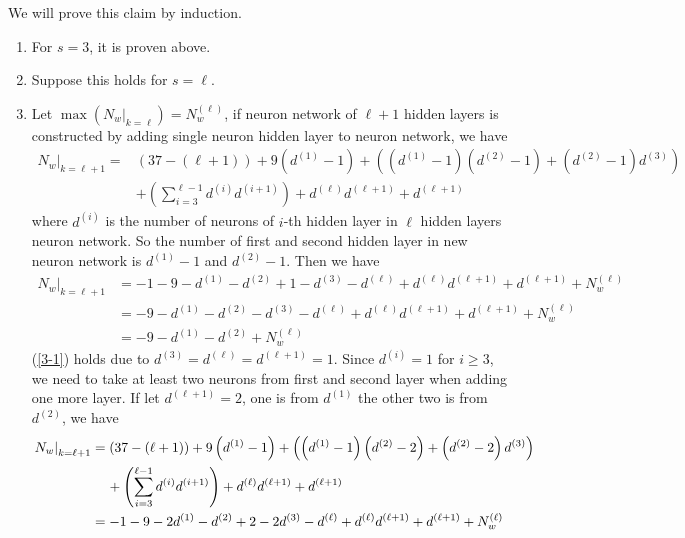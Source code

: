 \documentclass[12pt]{article}
\newcommand{\ParTh}[1]{\left(#1\right)}
\begin{document}
We will prove this claim by induction.
\begin{enumerate}
	\item For $s=3$, it is proven above.
	\item Suppose this holds for $s=\ell$.
	\item Let $\max\ParTh{\left.N_w\right|_{k=\ell}}=N^{\ParTh{\ell}}_w$, if neuron network of $\ell+1$ hidden layers is constructed by adding single neuron hidden layer to neuron network, we have
	\begin{align}
	\nonumber
	\left.N_w\right|_{k=\ell+1}=&\ParTh{37-\ParTh{\ell+1}}+9\ParTh{d^{\ParTh{1}}-1}+\ParTh{\ParTh{d^{\ParTh{1}}-1}\ParTh{d^{\ParTh{2}}-1}+\ParTh{d^{\ParTh{2}}-1}d^{\ParTh{3}}}\\
	&+\ParTh{\sum_{i=3}^{\ell-1}d^{\ParTh{i}}d^{\ParTh{i+1}}}+d^{\ParTh{\ell}}d^{\ParTh{\ell+1}}+d^{\ParTh{\ell+1}}
	\end{align}
	where $d^{\ParTh{i}}$ is the number of neurons of $i$-th hidden layer in $\ell$ hidden layers neuron network. So the number of first and second hidden layer in new neuron network is $d^{\ParTh{1}}-1$ and $d^{\ParTh{2}}-1$. Then we have
	\begin{align}
	\left.N_w\right|_{k=\ell+1}&=-1-9-d^{\ParTh{1}}-d^{\ParTh{2}}+1-d^{\ParTh{3}}-d^{\ParTh{\ell}}+d^{\ParTh{\ell}}d^{\ParTh{\ell+1}}+d^{\ParTh{\ell+1}}+N^{\ParTh{\ell}}_w\\
	&=-9-d^{\ParTh{1}}-d^{\ParTh{2}}-d^{\ParTh{3}}-d^{\ParTh{\ell}}+d^{\ParTh{\ell}}d^{\ParTh{\ell+1}}+d^{\ParTh{\ell+1}}+N^{\ParTh{\ell}}_w\\
	\label{3-1}
	&=-9-d^{\ParTh{1}}-d^{\ParTh{2}}+N^{\ParTh{\ell}}_w
	\end{align}
	(\ref{3-1}) holds due to $d^{\ParTh{3}}=d^{\ParTh{\ell}}=d^{\ParTh{\ell+1}}=1$. Since $d^{\ParTh{i}}=1$ for $i\geq3$, we need to take at least two neurons from first and second layer when adding one more layer. If let $d^{\ParTh{\ell+1}}=2$, one is from $d^{\ParTh{1}}$ the other two is from $d^{\ParTh{2}}$, we have
	\begin{align}
	\nonumber
	\left.N_w\right|_{k=\ell+1}&=\ParTh{37-\ParTh{\ell+1}}+9\ParTh{d^{\ParTh{1}}-1}+\ParTh{\ParTh{d^{\ParTh{1}}-1}\ParTh{d^{\ParTh{2}}-2}+\ParTh{d^{\ParTh{2}}-2}d^{\ParTh{3}}}\\
	&\hspace{4mm}+\ParTh{\sum_{i=3}^{\ell-1}d^{\ParTh{i}}d^{\ParTh{i+1}}}+d^{\ParTh{\ell}}d^{\ParTh{\ell+1}}+d^{\ParTh{\ell+1}}\\
	&=-1-9-2d^{\ParTh{1}}-d^{\ParTh{2}}+2-2d^{\ParTh{3}}-d^{\ParTh{\ell}}+d^{\ParTh{\ell}}d^{\ParTh{\ell+1}}+d^{\ParTh{\ell+1}}+N^{\ParTh{\ell}}_w\\

\end{align}
\end{enumerate}
\end{document}
